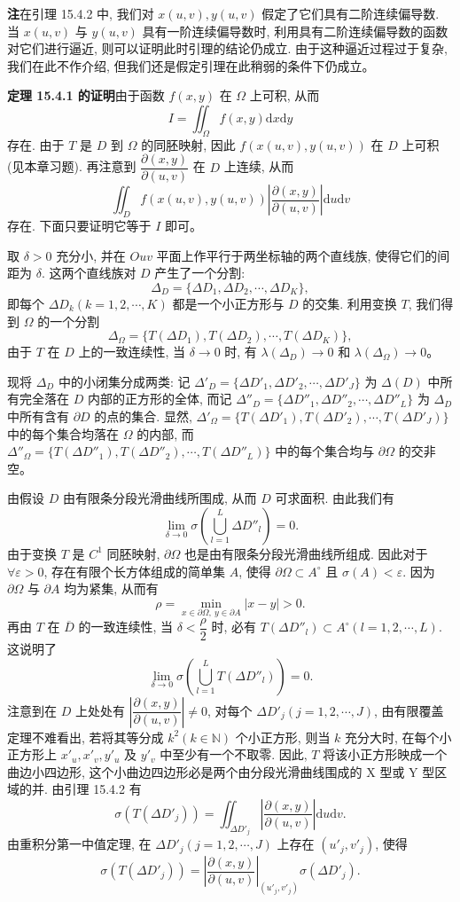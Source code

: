 \documentclass[UTF8,12pt,a4paper,fontset=fandol]{ctexart}
\begin{document}
\noindent\textbf{注}\quad 在引理 15.4.2 中, 我们对 $x(u,v),y(u,v)$ 假定了它们具有二阶连续偏导数. 当 $x(u,v)$ 与 $y(u,v)$ 具有一阶连续偏导数时, 利用具有二阶连续偏导数的函数对它们进行逼近, 则可以证明此时引理的结论仍成立. 由于这种逼近过程过于复杂, 我们在此不作介绍, 但我们还是假定引理在此稍弱的条件下仍成立。

\noindent\textbf{定理 15.4.1 的证明}\quad 由于函数 $f(x,y)$ 在 $\Omega$ 上可积, 从而
\[
  I=\iint_\Omega f(x,y)\mathrm dx\mathrm dy
\]
存在. 由于 $T$ 是 $D$ 到 $\Omega$ 的同胚映射, 因此 $f(x(u,v),y(u,v))$ 在 $D$ 上可积(见本章习题). 再注意到 $\dfrac{\partial(x,y)}{\partial(u,v)}$ 在 $D$ 上连续, 从而
\[
  \iint_D f(x(u,v),y(u,v))
  \left|\frac{\partial(x,y)}{\partial(u,v)}\right|\mathrm du\mathrm dv
\]
存在. 下面只要证明它等于 $I$ 即可。

取 $\delta>0$ 充分小, 并在 $Ouv$ 平面上作平行于两坐标轴的两个直线族, 使得它们的间距为 $\delta$. 这两个直线族对 $D$ 产生了一个分割:
\[
  \Delta_D=\{\Delta D_1,\Delta D_2,\cdots,\Delta D_K\},
\]
即每个 $\Delta D_k(k=1,2,\cdots,K)$ 都是一个小正方形与 $D$ 的交集. 利用变换 $T$, 我们得到 $\Omega$ 的一个分割
\[
  \Delta_\Omega=\{T(\Delta D_1),T(\Delta D_2),\cdots,T(\Delta D_K)\},
\]
由于 $T$ 在 $D$ 上的一致连续性, 当 $\delta\to0$ 时, 有 $\lambda(\Delta_D)\to0$ 和 $\lambda(\Delta_\Omega)\to0$。

现将 $\Delta_D$ 中的小闭集分成两类: 记 $\Delta'_D=\{\Delta D'_1,\Delta D'_2,\cdots,\Delta D'_J\}$ 为 $\Delta(D)$ 中所有完全落在 $D$ 内部的正方形的全体, 而记 $\Delta''_D=\{\Delta D''_1,\Delta D''_2,\cdots,\Delta D''_L\}$ 为 $\Delta_D$ 中所有含有 $\partial D$ 的点的集合. 显然, $\Delta'_\Omega=\{T(\Delta D'_1),T(\Delta D'_2),\cdots,T(\Delta D'_J)\}$ 中的每个集合均落在 $\Omega$ 的内部, 而 $\Delta''_\Omega=\{T(\Delta D''_1),T(\Delta D''_2),\cdots,T(\Delta D''_L)\}$ 中的每个集合均与 $\partial\Omega$ 的交非空。

由假设 $D$ 由有限条分段光滑曲线所围成, 从而 $D$ 可求面积. 由此我们有
\[
  \lim_{\delta\to0}\sigma\left(\bigcup_{l=1}^L\Delta D''_l\right)=0.
\]
由于变换 $T$ 是 $C^1$ 同胚映射, $\partial\Omega$ 也是由有限条分段光滑曲线所组成. 因此对于 $\forall\varepsilon>0$, 存在有限个长方体组成的简单集 $A$, 使得 $\partial\Omega\subset A^\circ$ 且 $\sigma(A)<\varepsilon$. 因为 $\partial\Omega$ 与 $\partial A$ 均为紧集, 从而有
\[
  \rho=\min_{x\in\partial\Omega,\ y\in\partial A}|x-y|>0.
\]
再由 $T$ 在 $\overline D$ 的一致连续性, 当 $\delta<\dfrac\rho2$ 时, 必有 $T(\Delta D''_l)\subset A^\circ(l=1,2,\cdots,L)$. 这说明了
\[
  \lim_{\delta\to0}\sigma\left(\bigcup_{l=1}^LT(\Delta D''_l)\right)=0.
\]
注意到在 $D$ 上处处有 $\left|\dfrac{\partial(x,y)}{\partial(u,v)}\right|\ne0$, 对每个 $\Delta D'_j(j=1,2,\cdots,J)$, 由有限覆盖定理不难看出, 若将其等分成 $k^2(k\in\mathbb N)$ 个小正方形, 则当 $k$ 充分大时, 在每个小正方形上 $x'_u,x'_v,y'_u$ 及 $y'_v$ 中至少有一个不取零. 因此, $T$ 将该小正方形映成一个曲边小四边形, 这个小曲边四边形必是两个由分段光滑曲线围成的 X 型或 Y 型区域的并. 由引理 15.4.2 有
\[
  \sigma(T(\Delta D'_j))
  =\iint_{\Delta D'_j}\left|\frac{\partial(x,y)}{\partial(u,v)}\right|\mathrm du\mathrm dv.
\]
由重积分第一中值定理, 在 $\Delta D'_j(j=1,2,\cdots,J)$ 上存在 $(u'_j,v'_j)$, 使得
\[
  \sigma(T(\Delta D'_j))
  =\left|\frac{\partial(x,y)}{\partial(u,v)}\right|_{(u'_j,v'_j)}
  \sigma(\Delta D'_j).
\]
\end{document}
